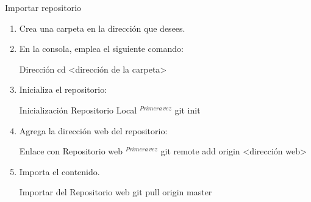 \begin{frame}[t]{Importar repositorio}\vspace{-2pt}

\begin{enumerate}
	\item Crea una carpeta en la dirección que desees.
	\item En la consola, emplea el siguiente comando:
	\begin{block}{Dirección}
		cd <dirección de la carpeta>
	\end{block}
	\item Inicializa el repositorio:
	\begin{block}{Inicialización Repositorio Local $^{Primera \, vez}$}
		git init
	\end{block}
	\item Agrega la dirección web del repositorio:
	\begin{block}{Enlace con Repositorio web $^{Primera \, vez}$}
		git remote add origin <dirección web>
	\end{block}
	\item Importa el contenido.
	\begin{block}{Importar del Repositorio web}
		git pull origin master
	\end{block}
\end{enumerate}


\end{frame}